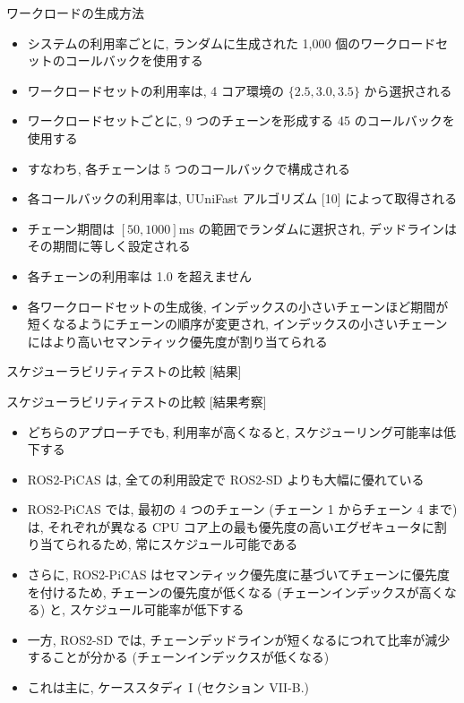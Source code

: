 \begin{frame}{ワークロードの生成方法}
    \begin{itemize}
        \item システムの利用率ごとに, ランダムに生成された 1,000 個のワークロードセットのコールバックを使用する
        \item ワークロードセットの利用率は, 4 コア環境の $\{2.5,3.0,3.5\}$ から選択される
        \item ワークロードセットごとに, 9 つのチェーンを形成する 45 のコールバックを使用する
        \item すなわち, 各チェーンは 5 つのコールバックで構成される
        \item 各コールバックの利用率は, UUniFast アルゴリズム [10] によって取得される
        \item チェーン期間は $[50,1000] \mathrm{ms}$ の範囲でランダムに選択され, デッドラインはその期間に等しく設定される
        \item 各チェーンの利用率は 1.0 を超えません
        \item 各ワークロードセットの生成後, インデックスの小さいチェーンほど期間が短くなるようにチェーンの順序が変更され, インデックスの小さいチェーンにはより高いセマンティック優先度が割り当てられる
    \end{itemize}
\end{frame}

\begin{frame}{スケジューラビリティテストの比較 [結果]}
\end{frame}

\begin{frame}{スケジューラビリティテストの比較 [結果考察]}
    \begin{itemize}
        \item どちらのアプローチでも, 利用率が高くなると, スケジューリング可能率は低下する
        \item ROS2-PiCAS は, 全ての利用設定で ROS2-SD よりも大幅に優れている
        \item ROS2-PiCAS では, 最初の 4 つのチェーン (チェーン 1 からチェーン 4 まで) は, それぞれが異なる CPU コア上の最も優先度の高いエグゼキュータに割り当てられるため, 常にスケジュール可能である
        \item さらに, ROS2-PiCAS はセマンティック優先度に基づいてチェーンに優先度を付けるため, チェーンの優先度が低くなる (チェーンインデックスが高くなる) と, スケジュール可能率が低下する
        \item 一方, ROS2-SD では, チェーンデッドラインが短くなるにつれて比率が減少することが分かる (チェーンインデックスが低くなる)
        \item これは主に, ケーススタディ I (セクション VII-B.)
    \end{itemize}
\end{frame}

